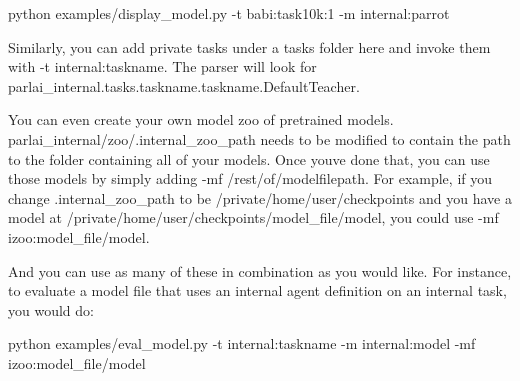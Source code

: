 \begin{DoxyCode}
python examples/display\_model.py -t babi:task10k:1 -m internal:parrot
\end{DoxyCode}


Similarly, you can add private tasks under a tasks folder here and invoke them with {\ttfamily -\/t internal\+:taskname}. The parser will look for {\ttfamily parlai\+\_\+internal.\+tasks.\+taskname.\+taskname.\+Default\+Teacher}.

You can even create your own model zoo of pretrained models. {\ttfamily parlai\+\_\+internal/zoo/.internal\+\_\+zoo\+\_\+path} needs to be modified to contain the path to the folder containing all of your models. Once you\textquotesingle{}ve done that, you can use those models by simply adding {\ttfamily -\/mf /rest/of/modelfilepath}. For example, if you change {\ttfamily .internal\+\_\+zoo\+\_\+path} to be {\ttfamily /private/home/user/checkpoints} and you have a model at {\ttfamily /private/home/user/checkpoints/model\+\_\+file/model}, you could use {\ttfamily -\/mf izoo\+:model\+\_\+file/model}.

And you can use as many of these in combination as you would like. For instance, to evaluate a model file that uses an internal agent definition on an internal task, you would do\+:


\begin{DoxyCode}
python examples/eval\_model.py -t internal:taskname -m internal:model -mf izoo:model\_file/model
\end{DoxyCode}
 